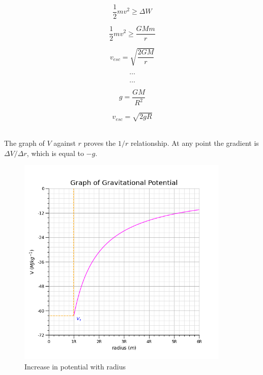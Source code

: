 \documentclass[12pt]{article}
\begin{document}
\begin{figure}[H]
\centering
\begin{minipage}{.8\textwidth}
\begin{tcolorbox}[
sharp corners=all,
colback=white,
colframe=white,
size=tight,
boxrule=0.2mm,
left=10mm, right=10mm
]
\begin{multicols}{2}
\noindent

\[\dfrac{1}{2} m v^2 \ge \Delta W\]

\[\dfrac{1}{2} m v^2 \ge \dfrac{GMm}{r}\]

\[ v_{esc} = \sqrt{\dfrac{2GM}{r}}\]

\[\textbf{\ldots}\]
\columnbreak


\[\textbf{\ldots}\]

\[g = \dfrac{GM}{R^2}\]

\[ v_{esc} = \sqrt{2gR}\]
\\

\end{multicols}
\end{tcolorbox}
\end{minipage}
\end{figure}

The graph of \(V\) against \(r\) proves the \(1/r\) relationship. At any point the gradient is \(\Delta V / \Delta r\), which is equal to \(-g\).

\begin{figure}[H]
\centering
\includegraphics[width=0.9\textwidth,keepaspectratio]{./images/gravitational_potential.png}
\caption{Increase in potential with radius}
\end{figure}
\end{document}
